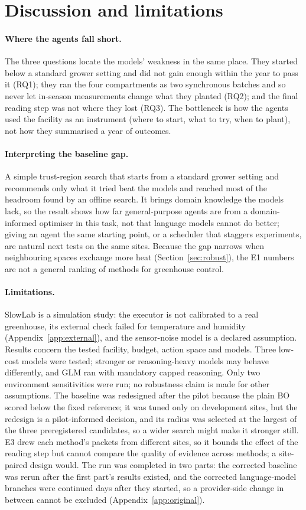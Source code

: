 \section{Discussion and limitations}
\label{sec:discussion}
\paragraph{Where the agents fall short.} The three questions locate the models' weakness in the same place. They started below a standard grower setting and did not gain enough within the year to pass it (RQ1); they ran the four compartments as two synchronous batches and so never let in-season measurements change what they planted (RQ2); and the final reading step was not where they lost (RQ3). The bottleneck is how the agents used the facility as an instrument (where to start, what to try, when to plant), not how they summarised a year of outcomes.

\paragraph{Interpreting the baseline gap.} A simple trust-region search that starts from a standard grower setting and recommends only what it tried beat the models and reached most of the headroom found by an offline search. It brings domain knowledge the models lack, so the result shows how far general-purpose agents are from a domain-informed optimiser in this task, not that language models cannot do better; giving an agent the same starting point, or a scheduler that staggers experiments, are natural next tests on the same sites. Because the gap narrows when neighbouring spaces exchange more heat (Section~\ref{sec:robust}), the E1 numbers are not a general ranking of methods for greenhouse control.

\paragraph{Limitations.} SlowLab is a simulation study: the executor is not calibrated to a real greenhouse, its external check failed for temperature and humidity (Appendix~\ref{app:external}), and the sensor-noise model is a declared assumption. Results concern the tested facility, budget, action space and models. Three low-cost models were tested; stronger or reasoning-heavy models may behave differently, and GLM ran with mandatory capped reasoning. Only two environment sensitivities were run; no robustness claim is made for other assumptions. The baseline was redesigned after the pilot because the plain BO scored below the fixed reference; it was tuned only on development sites, but the redesign is a pilot-informed decision, and its radius was selected at the largest of the three preregistered candidates, so a wider search might make it stronger still. E3 drew each method's packets from different sites, so it bounds the effect of the reading step but cannot compare the quality of evidence across methods; a site-paired design would. The run was completed in two parts: the corrected baseline was rerun after the first part's results existed, and the corrected language-model branches were continued days after they started, so a provider-side change in between cannot be excluded (Appendix~\ref{app:original}).
